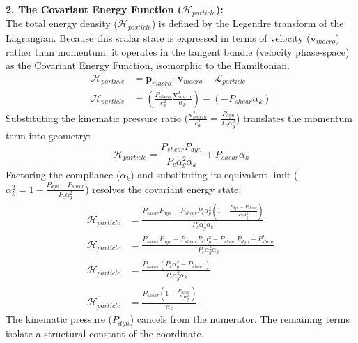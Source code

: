 \textbf{2. The Covariant Energy Function ($\mathcal{H}_{particle}$):} \\
The total energy density ($\mathcal{H}_{particle}$) is defined by the Legendre transform of the Lagrangian. Because this scalar state is expressed in terms of velocity ($\mathbf{v}_{macro}$) rather than momentum, it operates in the tangent bundle (velocity phase-space) as the Covariant Energy Function, isomorphic to the Hamiltonian. 
\begin{align}
    \mathcal{H}_{particle} &= \mathbf{p}_{macro} \cdot \mathbf{v}_{macro} - \mathcal{L}_{particle} \nonumber \\
    \mathcal{H}_{particle} &= \left( \frac{P_{shear}}{c_a^2} \frac{\mathbf{v}_{macro}^2}{\alpha_k} \right) - (-P_{shear} \alpha_k) \nonumber
\end{align}
Substituting the kinematic pressure ratio ($\frac{\mathbf{v}_{macro}^2}{c_a^2} = \frac{P_{dyn}}{P_c \alpha_g^2}$) translates the momentum term into geometry:
\begin{equation}
    \mathcal{H}_{particle} = \frac{P_{shear} P_{dyn}}{P_c \alpha_g^2 \alpha_k} + P_{shear} \alpha_k \nonumber
\end{equation}
Factoring the compliance ($\alpha_k$) and substituting its equivalent limit ($\alpha_k^2 = 1 - \frac{P_{dyn} + P_{shear}}{P_c \alpha_g^2}$) resolves the covariant energy state:
\begin{align}
    \mathcal{H}_{particle} &= \frac{P_{shear} P_{dyn} + P_{shear} P_c \alpha_g^2 \left( 1 - \frac{P_{dyn} + P_{shear}}{P_c \alpha_g^2} \right)}{P_c \alpha_g^2 \alpha_k} \nonumber \\
    \mathcal{H}_{particle} &= \frac{P_{shear} P_{dyn} + P_{shear} P_c \alpha_g^2 - P_{shear} P_{dyn} - P_{shear}^2}{P_c \alpha_g^2 \alpha_k} \nonumber \\
    \mathcal{H}_{particle} &= \frac{P_{shear} (P_c \alpha_g^2 - P_{shear})}{P_c \alpha_g^2 \alpha_k} \nonumber \\
    \mathcal{H}_{particle} &= \frac{P_{shear} \left(1 - \frac{P_{shear}}{P_c \alpha_g^2}\right)}{\alpha_k} \nonumber
\end{align}
The kinematic pressure ($P_{dyn}$) cancels from the numerator. The remaining terms isolate a structural constant of the coordinate.

